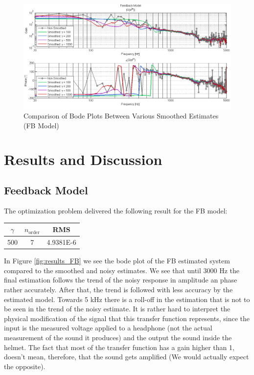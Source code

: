 \begin{figure}[h]
\centering
\includegraphics[width=1.0\textwidth]{pics/FB_Smoothing}
\caption{Comparison of Bode Plots Between Various Smoothed Estimates (FB Model)}
\label{fig:FB_Smoothing}
\end{figure}



\chapter{Results and Discussion}\label{chap: results}

\section{Feedback Model}
The optimization problem delivered the following result for the FB model:

\begin{table}[H]
\centering
\begin{tabular}{c|c|c}
$\gamma$ & $n_\text{order}$ & RMS \\ \hline
500 & 7 & 4.9381E-6 \\ 
\end{tabular}
\end{table}

In Figure \ref{fig:results_FB} we see the bode plot of the FB estimated system compared to the smoothed and noisy estimates. We see that until 3000 Hz the final estimation follows the trend of the noisy response in amplitude an phase rather accurately. After that, the trend is followed with less accuracy by the estimated model. Towards 5 kHz there is a roll-off in the estimation that is not to be seen in the trend of the noisy estimate. It is rather hard to interpret the physical modification of the signal that this transfer function represents, since the input is the measured voltage applied to a headphone (not the actual measurement of the sound it produces) and the output the sound inside the helmet. The fact that most of the transfer function has a gain higher than 1, doesn't mean, therefore, that the sound gets amplified (We would actually expect the opposite). \\


